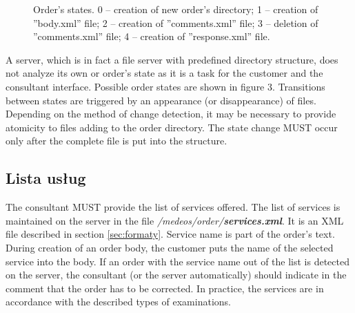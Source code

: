 \documentclass[a4paper]{article}
\begin{document}
\begin{figure}
\centering
{}
\caption[Order's states]{Order's states. 0 -- creation of new order's directory; 1 --
creation of ''body.xml'' file; 2 -- creation of ''comments.xml'' file; 3 -- deletion of 
''comments.xml'' file; 4 -- creation of ''response.xml'' file.}
\label{fig:stany_zlec}
\end{figure}

A server, which is in fact a file server with predefined directory structure, does not 
analyze its own or order's state as it is a task for the customer and the consultant interface.
Possible order states are shown in figure 3. Transitions between states are triggered by 
an appearance (or disappearance) of files. Depending on the method of change detection, 
it may be necessary to provide atomicity to files adding to the order directory. The state 
change MUST occur only after the complete file is put into the structure.

\subsection{Lista usług}

The consultant MUST provide the list of services offered. The list of services is 
maintained on the server in the file \textit{/medeos/order/\textbf{services.xml}}. It is an 
XML file described in section \ref{sec:formaty}. Service name is part of the order's text.
During creation of an order body, the customer puts the name of the selected service into 
the body. If an order with the service name out of the list is detected on the server, the 
consultant (or the server automatically) should indicate in the comment that the order has 
to be corrected. In practice, the services are in accordance with the described types of 
examinations.
\end{document}
